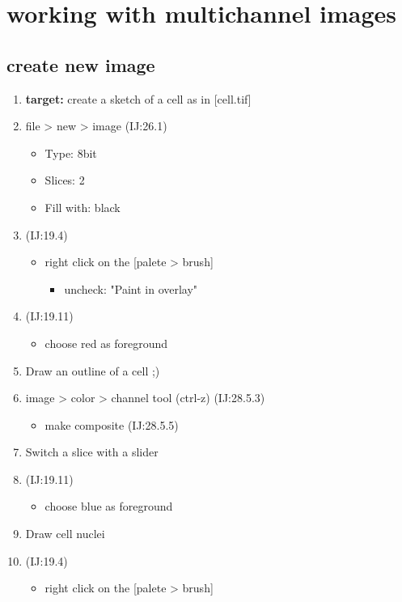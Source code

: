 \documentclass[11pt]{article}
\begin{document}
\section{working with multichannel images}
\label{sec-2}
\subsection{create new image}
\label{sec-2-1}
\begin{enumerate}
\item \textbf{target:} create a sketch of a cell as in [cell.tif]
\item file > new > image (IJ:26.1)
\begin{itemize}
\item Type: 8bit
\item Slices: 2
\item Fill with: black
\end{itemize}
\item{} (IJ:19.4)
\begin{itemize}
\item right click on the [palete > brush]
\begin{itemize}
\item uncheck: "Paint in overlay"
\end{itemize}
\end{itemize}
\item{} (IJ:19.11)
\begin{itemize}
\item choose red as foreground
\end{itemize}
\item Draw an outline of a cell ;)
\item image > color > channel tool (ctrl-z) (IJ:28.5.3)
\begin{itemize}
\item make composite (IJ:28.5.5)
\end{itemize}
\item Switch a slice with a slider
\item{} (IJ:19.11)
\begin{itemize}
\item choose blue as foreground
\end{itemize}
\item Draw cell nuclei
\item{} (IJ:19.4)
\begin{itemize}
\item right click on the [palete > brush]

\end{itemize}
\end{enumerate}
\end{document}
